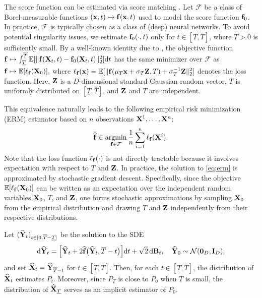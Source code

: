 \documentclass[11pt,a4paper,final]{article}
\numberwithin{equation}{section}
\theoremstyle{remark}
\def\cF{\mathcal F}
\def\cN{\mathcal N}
\newcommand{\bB}{{\bf B}}
\newcommand{\bff}{{\bf f}}
\newcommand{\bI}{{\bf I}}
\newcommand{\bx}{{\bf x}}
\newcommand{\bX}{{\bf X}}
\newcommand{\bY}{{\bf Y}}
\newcommand{\bZ}{{\bf Z}}
\newcommand{\bbE}{{\mathbb E}}
\newcommand{\be}{\begin{equation}}
\newcommand{\ee}{\end{equation}}
\newcommand{\bean}{\setlength\arraycolsep{1pt}\begin{eqnarray*}}
\newcommand{\eean}{\end{eqnarray*}}
\DeclareMathOperator*{\argmin}{argmin}
\def\d{{\rm d}}
\begin{document}
The score function can be estimated via score matching \citep{hyvarinen2005estimation, vincent2011connection, song2021scorebased}.
Let $\cF$ be a class of Borel-measurable functions $(\bx,t) \mapsto \bff(\bx,t)$ used to model the score function $\bff_0$.
In practice, $\cF$ is typically chosen as a class of (deep) neural networks.
To avoid potential singularity issues, we estimate $\bff_0(\cdot,t)$ only for $t \in [\underline{T},\overline{T}]$, where $\underline{T} > 0$ is sufficiently small.
By a well-known identity due to \cite{vincent2011connection}, the objective function
$
\bff \mapsto \int_{\underline{T}}^{\overline{T}} \bbE [ \| \bff( \bX_{t} , t ) - \bff_{0} (\bX_{t},t) \|_2^2 ] \d t
$
has the same minimizer over $\cF$ as
$
\bff \mapsto \bbE [  \ell_{\bff}( \bX_{0}) ],
$
where
$
\ell_{\bff}(\bx) = \bbE [ \| \bff( \mu_{T} \bx + \sigma_{T} \bZ , T ) + \sigma_{T}^{-1} \bZ \|_2^2  ]
$
denotes the loss function.
Here, $\bZ$ is a $D$-dimensional standard Gaussian random vector, $T$ is uniformly distributed on $[\underline{T},\overline{T}]$, and $\bZ$ and $T$ are independent.

This equivalence naturally leads to the following empirical risk minimization (ERM) estimator based on $n$ observations $\bX^1,\ldots,\bX^n$:
\be
\widehat \bff \in \argmin_{\bff \in \cF}
\frac{1}{n} \sum_{i=1}^n \ell_{\bff}(\bX^{i}).
\label{eq:erm}
\ee
Note that the loss function $\ell_{\bff}(\cdot)$ is not directly tractable because it involves expectation with respect to $T$ and $\bZ$.
In practice, the solution to \eqref{eq:erm} is approximated by stochastic gradient descent.
Specifically, since the objective $\bbE[\ell_{\bff}(\bX_{0})]$ can be written as an expectation over the independent random variables $\bX_0$, $T$, and $\bZ$, one forms stochastic approximations by sampling $\bX_0$ from the empirical distribution and drawing $T$ and $\bZ$ independently from their respective distributions.

Let $(\widehat \bY_t)_{t \in [0,\overline{T}-\underline{T}]}$ be the solution to the SDE
\be
\d \widehat \bY_t
=
\Big[\widehat \bY_t + 2 \widehat \bff \big(\widehat \bY_t,\overline{T}-t \big)\Big]\d t
+ \sqrt{2}\,\d \bB_t,
\quad
\widehat \bY_0 \sim \cN(\mathbf{0}_D,\bI_D),
\label{eq:diffusion}
\ee
and set $\widehat \bX_t = \widehat \bY_{\overline{T}-t}$ for $t \in [\underline{T},\overline{T}]$.
Then, for each $t \in [\underline{T},\overline{T}]$, the distribution of $\widehat \bX_t$ estimates $P_t$.
Moreover, since $P_{\underline{T}}$ is close to $P_0$ when $\underline{T}$ is small, the distribution of $\widehat \bX_{\underline{T}}$ serves as an implicit estimator of $P_0$.
\end{document}

